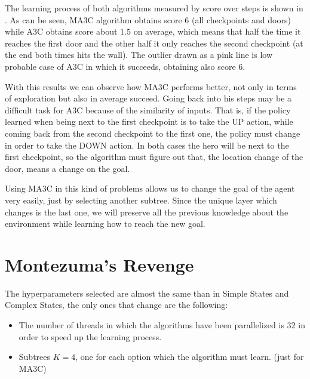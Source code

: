 The learning process of both algorithms measured by score over steps is shown in .
As can be seen, \ac{MA3C} algorithm obtains score $6$ (all checkpoints and doors) while \ac{A3C} obtains score about $1.5$ on average,
which means that half the time it reaches the first door and the other half it only reaches the second checkpoint
(at the end both times hits the wall).
The outlier drawn as a pink line is low probable case of \ac{A3C} in which it succeeds, obtaining also score $6$.

With this results we can observe how \ac{MA3C} performs better, not only in terms of exploration but also in average succeed.
Going back into his steps may be a difficult task for \ac{A3C} because of the similarity of inputs.
That is, if the policy learned when being next to the first checkpoint is to take the \textsc{UP} action, while coming back
from the second checkpoint to the first one, the policy must change in order to take the \textsc{DOWN} action.
In both cases the hero will be next to the first checkpoint, so the algorithm must figure out that, the location change
of the door, means a change on the goal.

Using \ac{MA3C} in this kind of problems allows us to change the goal of the agent very easily, just by selecting another
subtree.
Since the unique layer which changes is the last one, we will preserve all the previous knowledge about the environment
while learning how to reach the new goal.


\section{Montezuma's Revenge}

The hyperparameters selected are almost the same than in Simple States and Complex States, the only ones that change are
the following:
\begin{itemize}
    \item The number of threads in which the algorithms have been parallelized is $32$ in order to speed up the learning
    process.
    \item Subtrees $K = 4$, one for each option which the algorithm must learn. (just for \ac{MA3C})
\end{itemize}

